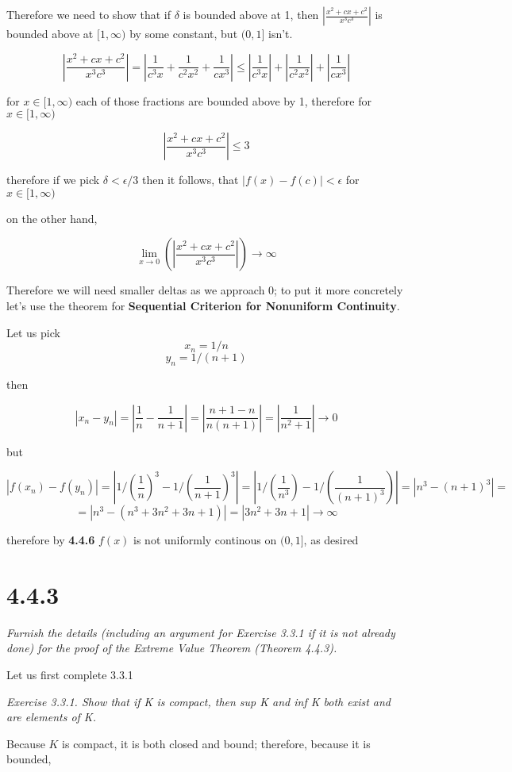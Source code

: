 \documentclass[11pt,oneside,titlepage]{article}
\begin{document}
Therefore we need to show that if $\delta$ is bounded above at 1, then
$|\frac{x^2 + cx + c^2}{x^3c^3}|$ is bounded above at $[1, \infty)$ by
some constant, but  $(0, 1]$ isn't.

$$ |\frac{x^2 + cx + c^2}{x^3c^3}| = |\frac{1}{c^3 x} + \frac{1}{c^2x^2}
+ \frac{1}{cx^3}| \leq
|\frac{1}{c^3 x}| + |\frac{1}{c^2x^2}| + |\frac{1}{cx^3}|
$$

for $x \in [1, \infty)$ each of those fractions are bounded above by 1,
therefore for $x \in [1, \infty)$

$$ |\frac{x^2 + cx + c^2}{x^3c^3}| \leq 3 $$

therefore if we pick $\delta < \epsilon / 3 $ then it follows, that
$|f(x) - f(c)| < \epsilon$ for $x \in [1, \infty)$

on the other hand,

$$ \lim_{x \to 0}(|\frac{x^2 + cx + c^2}{x^3c^3}|) \to \infty  $$

Therefore we will need smaller deltas as we approach 0; to put it more
concretely let's use the theorem for
\textbf{Sequential Criterion for Nonuniform Continuity}.

Let us pick
$$x_n = 1/n$$
$$y_n = 1/(n + 1)$$

then

$$|x_n - y_n| = |\frac{1}{n} - \frac{1}{n + 1}| = |\frac{n + 1 - n}{n(n + 1)}|
= |\frac{1}{n ^ 2 + 1}| \to 0$$

but

$$ |f(x_n) - f(y_n)| = |1/(\frac{1}{n})^3 - 1/(\frac{1}{n + 1})^3| = |1/(\frac{1}{n^3}) - 1/(\frac{1}{(n + 1)^3})| =  |n^3 - (n + 1)^3| =  $$
$$ = |n^3 - (n ^ 3 + 3 n^2 + 3 n + 1)| = |3n^2 + 3n + 1| \to \infty$$

therefore by \textbf{4.4.6} $f(x)$ is not uniformly continous on $(0, 1]$, as desired

\section*{4.4.3}
\textit{Furnish the details (including an argument for Exercise 3.3.1 if it is not already done) for the proof of the Extreme Value Theorem (Theorem 4.4.3).}

Let us first complete 3.3.1

\textit{Exercise 3.3.1. Show that if K is compact, then sup K and inf K both exist and are elements of K.}

Because $K$ is compact, it is both closed and bound; therefore, because it is bounded,
\end{document}

